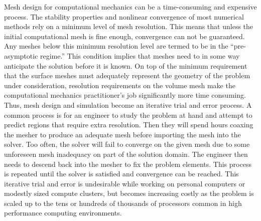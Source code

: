 \documentclass[letterpaper,12pt]{article}
\begin{document}
Mesh design for computational mechanics can be a time-consuming and expensive process.
The stability properties and nonlinear convergence of most numerical methods rely on a minimum level of mesh resolution. 
This means that unless the initial computational mesh is fine enough, convergence can not be guaranteed. 
Any meshes below this minimum resolution level are termed to be in the ``pre-asymptotic regime.'' 
This condition implies that meshes need to in some way anticipate the solution before it is known. 
On top of the minimum requirement that the surface meshes must adequately represent the geometry of the problem under consideration, 
resolution requirements on the volume mesh make the computational mechanics practitioner's job significantly more time consuming. 
Thus, mesh design and simulation become an iterative trial and error process.
A common process is for an engineer to study the problem at hand and attempt to predict regions that require extra resolution. 
Then they will spend hours coaxing the mesher to produce an adequate mesh before importing the mesh into the solver.
Too often, the solver will fail to converge on the given mesh due to some unforeseen mesh inadequacy on part of the solution domain.
The engineer then needs to descend back into the mesher to fix the problem elements.
This process is repeated until the solver is satisfied and convergence can be reached.
This iterative trial and error is undesirable while working on personal computers or modestly sized compute clusters, 
but becomes increasing costly as the problem is scaled up to the tens or hundreds of thousands of processors common in high performance computing environments.
\end{document}
